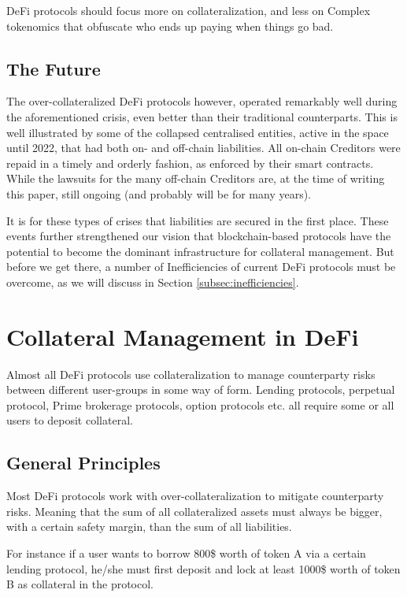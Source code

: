 \documentclass[sigconf,nonacm]{acmart}
\begin{document}
DeFi protocols should focus more on collateralization, and less on Complex tokenomics that obfuscate who ends up paying when things go bad.

\subsection{The Future}
The over-collateralized DeFi protocols however, operated remarkably well during the aforementioned crisis, even better than their traditional counterparts.
This is well illustrated by some of the collapsed centralised entities, active in the space until 2022, that had both on- and off-chain liabilities.
All on-chain Creditors were repaid in a timely and orderly fashion, as enforced by their smart contracts.
While the lawsuits for the many off-chain Creditors are, at the time of writing this paper, still ongoing (and probably will be for many years).

It is for these types of crises that liabilities are secured in the first place.
These events further strengthened our vision that blockchain-based protocols have the potential to become the dominant infrastructure for collateral management.
But before we get there, a number of Inefficiencies of current DeFi protocols must be overcome, as we will discuss in Section \ref{subsec:inefficiencies}.

\section{Collateral Management in DeFi}
\label{sec:collateral-management-in-DeFi}
Almost all DeFi protocols use collateralization to manage counterparty risks between different user-groups in some way of form.
Lending protocols, perpetual protocol, Prime brokerage protocols, option protocols etc. all require some or all users to deposit collateral.

\subsection{General Principles}
Most DeFi protocols work with over-collateralization to mitigate counterparty risks.
Meaning that the sum of all collateralized assets must always be bigger, with a certain safety margin, than the sum of all liabilities.

For instance if a user wants to borrow 800\$ worth of token A via a certain lending protocol,
he/she must first deposit and lock at least 1000\$ worth of token B as collateral in the protocol.
\end{document}

